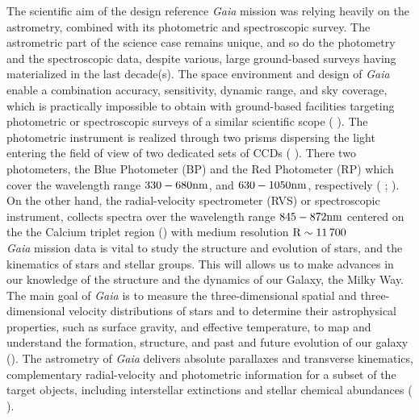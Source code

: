 The scientific aim of the design reference \textit{Gaia} mission was relying heavily on the astrometry, combined with its photometric and spectroscopic survey. The astrometric part of the science case remains unique, and so do the photometry and the spectroscopic data, despite various, large ground-based surveys having materialized in the last decade(s). The space environment and design of \textit{Gaia} enable a combination accuracy, sensitivity, dynamic range, and sky coverage, which is practically impossible to obtain with ground-based facilities targeting photometric or spectroscopic surveys of a similar scientific scope ( \citeyear{2016A&A...595A...1G}). The photometric instrument is realized through two prisms dispersing the light entering the field of view of two dedicated sets of CCDs ( \citeyear{2016A&A...595A...2G}). There two photometers, the Blue Photometer (BP) and the Red Photometer (RP) which cover the wavelength range $330-680\textnormal{nm}$, and $630-1050\textnormal{nm}$, respectively ( \citeyear{2016A&A...595A...7C};  \citeyear{2010A&A...523A..48J}). On the other hand, the radial-velocity spectrometer (RVS) or spectroscopic instrument, collects spectra over the wavelength range $845-872\textnormal{nm}$ centered on the the Calcium triplet region  (\citeyear{2010EAS....45..181C}) with medium resolution $\textnormal{R}\sim11\,700$\\

\textit{Gaia} mission data is vital to study the structure and evolution of stars, and the kinematics of stars and stellar groups. This will allows us to make advances in our knowledge of the structure and the dynamics of our Galaxy, the Milky Way. The main goal of \textit{Gaia} is to measure the three-dimensional spatial and three-dimensional velocity distributions of stars and to determine their astrophysical properties, such as surface gravity, and effective temperature, to map and understand the formation, structure, and past and future evolution of our galaxy  (\citeyear{2016ARA&A..54..529B}). The astrometry of \textit{Gaia} delivers absolute parallaxes and transverse kinematics, complementary radial-velocity and photometric information for a subset of the target objects, including interstellar extinctions and stellar chemical abundances ( \citeyear{2016A&A...595A...1G}).\\

